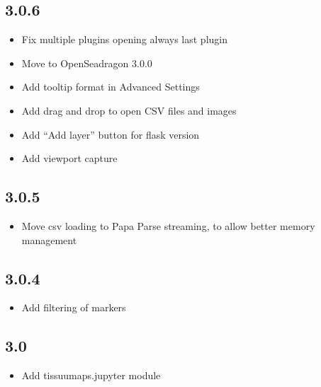 \documentclass[letterpaper,10pt,english,openany,oneside]{sphinxmanual}
\begin{document}
\subsection{3.0.6}
\label{\detokenize{docs/intro/versions:id13}}\begin{itemize}
\item {} 
\sphinxAtStartPar
Fix multiple plugins opening always last plugin

\item {} 
\sphinxAtStartPar
Move to OpenSeadragon 3.0.0

\item {} 
\sphinxAtStartPar
Add tooltip format in Advanced Settings

\item {} 
\sphinxAtStartPar
Add drag and drop to open CSV files and images

\item {} 
\sphinxAtStartPar
Add “Add layer” button for flask version

\item {} 
\sphinxAtStartPar
Add viewport capture

\end{itemize}


\subsection{3.0.5}
\label{\detokenize{docs/intro/versions:id14}}\begin{itemize}
\item {} 
\sphinxAtStartPar
Move csv loading to Papa Parse streaming, to allow better memory management

\end{itemize}


\subsection{3.0.4}
\label{\detokenize{docs/intro/versions:id15}}\begin{itemize}
\item {} 
\sphinxAtStartPar
Add filtering of markers

\end{itemize}


\subsection{3.0}
\label{\detokenize{docs/intro/versions:id16}}\begin{itemize}
\item {} 
\sphinxAtStartPar
Add tissuumaps.jupyter module

\end{itemize}
\end{document}
